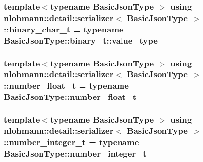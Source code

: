 \subsubsection[{\texorpdfstring{binary\+\_\+char\+\_\+t}{binary_char_t}}]{\setlength{\rightskip}{0pt plus 5cm}template$<$typename Basic\+Json\+Type $>$ using {\bf nlohmann\+::detail\+::serializer}$<$ Basic\+Json\+Type $>$\+::{\bf binary\+\_\+char\+\_\+t} =  typename Basic\+Json\+Type\+::binary\+\_\+t\+::value\+\_\+type\hspace{0.3cm}{\ttfamily [private]}}\hypertarget{classnlohmann_1_1detail_1_1serializer_aaaec32f2fec57db422019a11994f7bb5}{}\label{classnlohmann_1_1detail_1_1serializer_aaaec32f2fec57db422019a11994f7bb5}
\subsubsection[{\texorpdfstring{number\+\_\+float\+\_\+t}{number_float_t}}]{\setlength{\rightskip}{0pt plus 5cm}template$<$typename Basic\+Json\+Type $>$ using {\bf nlohmann\+::detail\+::serializer}$<$ Basic\+Json\+Type $>$\+::{\bf number\+\_\+float\+\_\+t} =  typename Basic\+Json\+Type\+::number\+\_\+float\+\_\+t\hspace{0.3cm}{\ttfamily [private]}}\hypertarget{classnlohmann_1_1detail_1_1serializer_a460c6794fbabbb2ae83380e987a6c030}{}\label{classnlohmann_1_1detail_1_1serializer_a460c6794fbabbb2ae83380e987a6c030}
\subsubsection[{\texorpdfstring{number\+\_\+integer\+\_\+t}{number_integer_t}}]{\setlength{\rightskip}{0pt plus 5cm}template$<$typename Basic\+Json\+Type $>$ using {\bf nlohmann\+::detail\+::serializer}$<$ Basic\+Json\+Type $>$\+::{\bf number\+\_\+integer\+\_\+t} =  typename Basic\+Json\+Type\+::number\+\_\+integer\+\_\+t\hspace{0.3cm}{\ttfamily [private]}}\hypertarget{classnlohmann_1_1detail_1_1serializer_ae7b1df1c70bdec1371f297567726a198}{}\label{classnlohmann_1_1detail_1_1serializer_ae7b1df1c70bdec1371f297567726a198}
